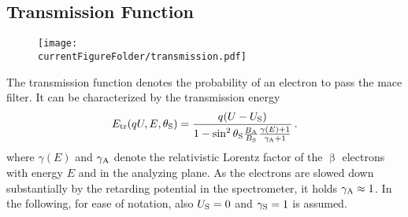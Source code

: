 \subsection{Transmission Function}
\label{sec:intSpecModelResponseTransmission}
\begin{figure}
	\centering
	\texttt{[image: \\currentFigureFolder/transmission.pdf]}
	\label{fig:intSpecModelTransmission}
\end{figure}
The transmission function denotes the probability of an electron to pass the \gls{mace} filter. It can be characterized by the transmission energy~\cite{Groh2015}
\begin{equation}
\label{eq:intSpecModelTransmissionEnergy}
E_\mathrm{tr}(qU,E,\theta_\mathrm{S}) = 
\frac{
	q(U-U_\mathrm{S})
}{
	1-\sin^2\theta_\mathrm{S} \frac{B_\mathrm{A}}{B_\mathrm{S}} \frac{\gamma(E)+1}{\gamma_\mathrm{A}+1}
}
\text{\,.}
\end{equation}
where $\gamma(E)$ and $\gamma_\mathrm{A}$ denote the relativistic Lorentz factor of the $\upbeta$ electrons with energy $E$ and in the analyzing plane. As the electrons are slowed down substantially by the retarding potential in the spectrometer, it holds $\gamma_\mathrm{A}\approx1$. In the following, for ease of notation, also $U_\mathrm{S}=0$ and $\gamma_\mathrm{S}=1$ is assumed.

